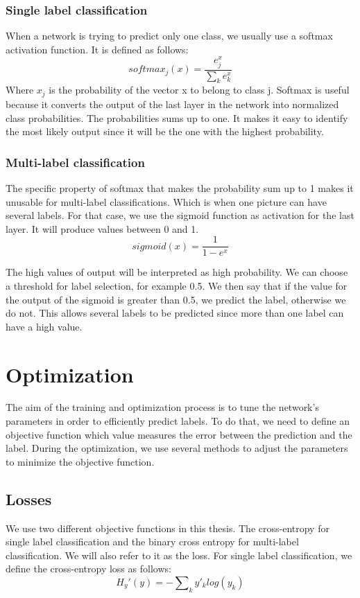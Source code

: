 \subsubsection{Single label classification}
When a network is trying to predict only one class, we usually use a softmax activation function. It is defined as follows:
\begin{equation}
    softmax_j(x) = \frac{e^x_{j}}{\sum\nolimits_{k} e^x_{k}}
\end{equation}
Where \(x_j\) is the probability of the vector x to belong to class j. Softmax is useful because it converts the output of the last layer in the network into normalized class probabilities. The probabilities sums up to one. It makes it easy to identify the most likely output since it will be the one with the highest probability. 
\subsubsection{Multi-label classification}
The specific property of softmax that makes the probability sum up to 1 makes it unusable for multi-label classifications. Which is when one picture can have several labels. For that case, we use the sigmoid function as activation for the last layer. It will produce values between 0 and 1.
\begin{equation}
    sigmoid(x) = \frac{1}{1 - e^x} 
\end{equation}

The high values of output will be interpreted as high probability. We can choose a threshold for label selection, for example 0.5. We then say that if the value for the output of the sigmoid is greater than 0.5, we predict the label, otherwise we do not. This allows several labels to be predicted since more than one label can have a high value. 

\section{Optimization}
The aim of the training and optimization process is to tune the network's parameters in order to efficiently predict labels. To do that, we need to define an objective function which value measures the error between the prediction and the label. During the optimization, we use several methods to adjust the parameters to minimize the objective function.

\subsection{Losses} \label{sec:loss}
We use two different objective functions in this thesis. The cross-entropy for single label classification and the binary cross entropy for multi-label classification. We will also refer to it as the loss. 
For single label classification, we define the cross-entropy loss as follows:
\begin{equation}
    H_y'(y) = - \sum\nolimits_k y'_k log(y_k)
\end{equation}

